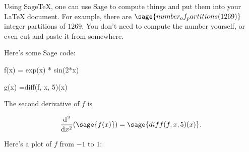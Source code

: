 \documentclass{article}
\begin{document}
Using Sage\TeX, one can use Sage to compute things and put them into
your \LaTeX{} document. For example, there are
$\sage{number_of_partitions(1269)}$ integer partitions of $1269$.
You don't need to compute the number yourself, or even cut and paste
it from somewhere.

Here's some Sage code:

\begin{sageblock}
    f(x) = exp(x) * sin(2*x)
\end{sageblock}
\begin{sageblock}
    g(x) =diff(f, x, 5)(x)
\end{sageblock}
The second derivative of $f$ is

\[
  \frac{\mathrm{d}^{2}}{\mathrm{d}x^{2}} (\sage{f(x)}) =
  \sage{diff(f, x, 5)(x)}.
\]

Here's a plot of $f$ from $-1$ to $1$:

\end{document}
